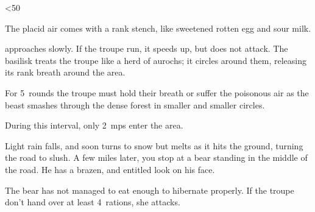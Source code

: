 \ifnum\thefenestraDay<50%
  \begin{boxtext}
    The placid air comes with a rank stench, like sweetened rotten egg and sour milk.
  \end{boxtext}

   approaches slowly.
  If the troupe run, it speeds up, but does not attack.
  The \gls{basilisk} treats the troupe like a herd of aurochs;
  it circles around them, releasing its rank breath around the area.

  For 5~\glspl{round} the troupe must hold their breath%
  or suffer the poisonous air as the beast smashes through the dense forest in smaller and smaller circles.

  During this \gls{interval}, only 2~\glspl{mp} enter the \gls{area}.

  \basilisk

\else%

  \begin{boxtext}
    Light rain falls, and soon turns to snow but melts as it hits the ground, turning the road to slush.
    A few miles later, you stop at a bear standing in the middle of the road.
    He has a brazen, and entitled look on his face.
  \end{boxtext}

  The bear has not managed to eat enough to hibernate properly.
  If the troupe don't hand over at least 4~\glspl{ration}, she attacks.

  \bear

\fi
